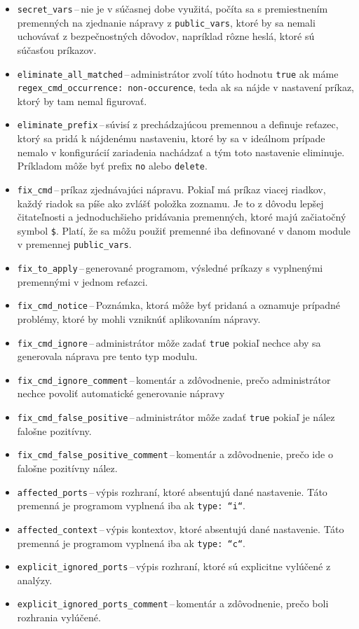 \begin{itemize}
	\item \texttt{secret\_vars}\,--\,nie je v súčasnej dobe využitá, počíta sa s premiestnením premenných na zjednanie nápravy z \texttt{public\_vars}, ktoré by sa nemali uchovávať z bezpečnostných dôvodov, napríklad rôzne heslá, ktoré sú súčasťou príkazov.
	\item \texttt{eliminate\_all\_matched}\,--\,administrátor zvolí túto hodnotu \texttt{true} ak máme \texttt{regex\_cmd\_occurrence: non-occurence}, teda ak sa nájde v nastavení príkaz, ktorý by tam nemal figurovať.
	\item \texttt{eliminate\_prefix}\,--\,súvisí z prechádzajúcou premennou a definuje reťazec, ktorý sa pridá k nájdenému nastaveniu, ktoré by sa v ideálnom prípade nemalo v konfigurácií zariadenia nachádzať a tým toto nastavenie eliminuje. Príkladom môže byť prefix \texttt{no} alebo \texttt{delete}.
	\item \texttt{fix\_cmd}\,--\,príkaz zjednávajúci nápravu. Pokiaľ má príkaz viacej riadkov, každý riadok sa píše ako zvlášť položka zoznamu. Je to z dôvodu  lepšej čitateľnosti a jednoduchšieho pridávania premenných, ktoré majú začiatočný symbol \texttt{\$}. Platí, že sa môžu použiť premenné iba definované v danom module v premennej \texttt{public\_vars}.
	\item \texttt{fix\_to\_apply}\,--\,generované programom, výsledné príkazy s vyplnenými premennými v jednom reťazci.
	\item \texttt{fix\_cmd\_notice}\,--\,Poznámka, ktorá môže byť pridaná a oznamuje prípadné problémy, ktoré by mohli vzniknúť aplikovaním nápravy.
	\item \texttt{fix\_cmd\_ignore}\,--\,administrátor môže zadať \texttt{true} pokiaľ nechce aby sa generovala náprava pre tento typ modulu.
	\item \texttt{fix\_cmd\_ignore\_comment}\,--\,komentár a zdôvodnenie, prečo administrátor nechce povoliť automatické generovanie nápravy
	\item \texttt{fix\_cmd\_false\_positive}\,--\,administrátor môže zadať \texttt{true} pokiaľ je nález falošne pozitívny.
	\item \texttt{fix\_cmd\_false\_positive\_comment}\,--\,komentár a zdôvodnenie, prečo ide o falošne pozitívny nález.
	\item \texttt{affected\_ports}\,--\,výpis rozhraní, ktoré absentujú dané nastavenie. Táto premenná je programom vyplnená iba ak \texttt{type: ``i``}.
	\item \texttt{affected\_context}\,--\,výpis kontextov, ktoré absentujú dané nastavenie. Táto premenná je programom vyplnená iba ak \texttt{type: ``c``}.
	\item \texttt{explicit\_ignored\_ports}\,--\,výpis rozhraní, ktoré sú explicitne vylúčené z analýzy.
	\item \texttt{explicit\_ignored\_ports\_comment}\,--\,komentár a zdôvodnenie, prečo boli rozhrania vylúčené.
\end{itemize}
\newpage
\vspace{1em}

